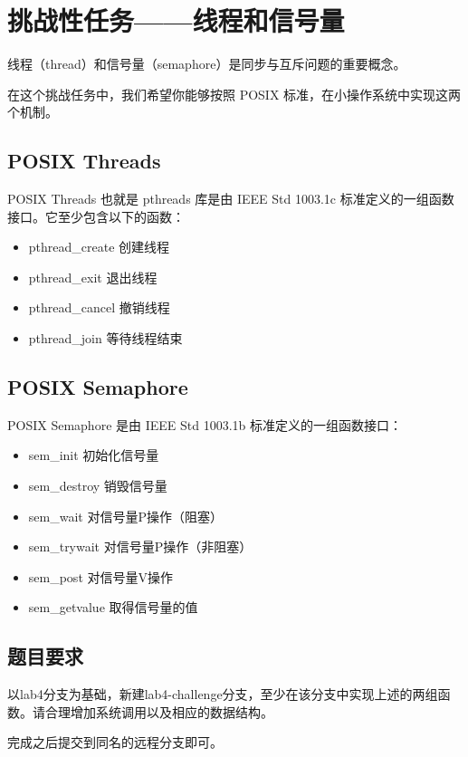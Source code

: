 \section{挑战性任务——线程和信号量}


线程（thread）和信号量（semaphore）是同步与互斥问题的重要概念。

在这个挑战任务中，我们希望你能够按照 POSIX 标准，在小操作系统中实现这两个机制。


\subsection{POSIX Threads}

POSIX Threads 也就是 pthreads 库是由 IEEE Std 1003.1c 标准定义的一组函数接口。它至少包含以下的函数：

\begin{itemize}
    \item pthread\_create 创建线程
    \item pthread\_exit 退出线程
    \item pthread\_cancel 撤销线程
    \item pthread\_join 等待线程结束
\end{itemize}


\subsection{POSIX Semaphore}

POSIX Semaphore 是由 IEEE Std 1003.1b 标准定义的一组函数接口：

\begin{itemize}
    \item sem\_init 初始化信号量
    \item sem\_destroy 销毁信号量
    \item sem\_wait 对信号量P操作（阻塞）
    \item sem\_trywait 对信号量P操作（非阻塞）
    \item sem\_post 对信号量V操作
    \item sem\_getvalue 取得信号量的值
\end{itemize}


\subsection{题目要求}

以lab4分支为基础，新建lab4-challenge分支，至少在该分支中实现上述的两组函数。请合理增加系统调用以及相应的数据结构。

完成之后提交到同名的远程分支即可。


